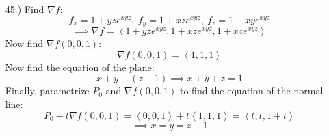 \documentclass[12pt]{article}
\newcommand{\angleb}[1]{\left\langle#1\right\rangle}
\begin{document}
\begin{itemize}
    \pagebreak
    \item [45.)] Find $\nabla f$:
    \[f_x=1+yze^{xyz},\ f_y=1+xze^{xyz},\ f_z=1+xye^{xyz}\]
    \[\implies\nabla f=\angleb{1+yze^{xyz},1+xze^{xyz},1+xze^{xyz}}\]
    Now find $\nabla f(0,0,1)$:
    \[\nabla f(0,0,1)=\angleb{1,1,1}\]
    Now find the equation of the plane:
    \[x+y+(z-1)\implies x+y+z=1\]
    Finally, parametrize $P_0$ and $\nabla f(0,0,1)$ to find the equation of the normal line:
    \[P_0+t\nabla f(0,0,1)=\angleb{0,0,1}+t\angleb{1,1,1}=\angleb{t,t,1+t}\]
    \[\implies x=y=z-1\]
\end{itemize}
\end{document}
